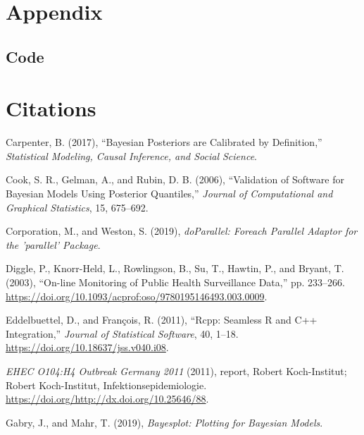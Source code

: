 \documentclass[11pt,a4paper]{article}
\numberwithin{equation}{section}
\begin{document}
\pagebreak

\hypertarget{appendix}{%
\section{Appendix}\label{appendix}}

\hypertarget{code}{%
\subsection{Code}\label{code}}

\pagebreak

\hypertarget{citations}{%
\section*{Citations}\label{citations}}

\hypertarget{refs}{}
\leavevmode\hypertarget{ref-carpenter_bayesian_2017}{}%
Carpenter, B. (2017), ``Bayesian Posteriors are Calibrated by
Definition,'' \emph{Statistical Modeling, Causal Inference, and Social
Science}.

\leavevmode\hypertarget{ref-cook_validation_2006}{}%
Cook, S. R., Gelman, A., and Rubin, D. B. (2006), ``Validation of
Software for Bayesian Models Using Posterior Quantiles,'' \emph{Journal
of Computational and Graphical Statistics}, 15, 675--692.

\leavevmode\hypertarget{ref-corporation_doparallel:_2019}{}%
Corporation, M., and Weston, S. (2019), \emph{doParallel: Foreach
Parallel Adaptor for the 'parallel' Package}.

\leavevmode\hypertarget{ref-diggle_-line_2003}{}%
Diggle, P., Knorr-Held, L., Rowlingson, B., Su, T., Hawtin, P., and
Bryant, T. (2003), ``On-line Monitoring of Public Health Surveillance
Data,'' pp. 233--266.
\url{https://doi.org/10.1093/acprof:oso/9780195146493.003.0009}.

\leavevmode\hypertarget{ref-eddelbuettel_rcpp:_2011}{}%
Eddelbuettel, D., and François, R. (2011), ``Rcpp: Seamless R and C++
Integration,'' \emph{Journal of Statistical Software}, 40, 1--18.
\url{https://doi.org/10.18637/jss.v040.i08}.

\leavevmode\hypertarget{ref-noauthor_ehec_2011}{}%
\emph{EHEC O104:H4 Outbreak Germany 2011} (2011), report, Robert
Koch-Institut; Robert Koch-Institut, Infektionsepidemiologie.
\url{https://doi.org/http://dx.doi.org/10.25646/88}.

\leavevmode\hypertarget{ref-gabry_bayesplot:_2019}{}%
Gabry, J., and Mahr, T. (2019), \emph{Bayesplot: Plotting for Bayesian
Models}.
\end{document}

